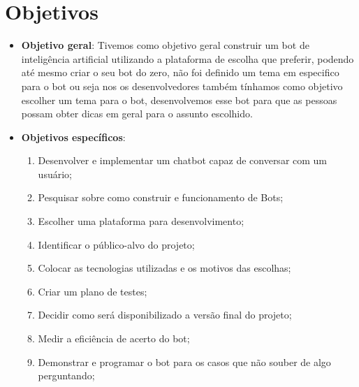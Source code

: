 \section{Objetivos}
\label{objetivos}


\begin{itemize}
		\item \textbf{Objetivo geral}: 
		    Tivemos como objetivo geral construir um bot de inteligência artificial utilizando a plataforma de escolha que preferir, podendo até mesmo criar o seu bot do zero, não foi definido um tema em especifico para o bot ou seja nos os desenvolvedores também tínhamos como objetivo escolher um tema para o bot, desenvolvemos esse bot para que as pessoas possam obter dicas em geral para o assunto escolhido.
		
		\item \textbf{Objetivos específicos}: 
    		\begin{enumerate}
    		    \item
    		        Desenvolver e implementar um chatbot capaz de conversar com um usuário;
    		    \item 
    		        Pesquisar sobre como construir e funcionamento de Bots;
    		    \item
    		        Escolher uma plataforma para desenvolvimento;
    		    \item 
    		        Identificar o público-alvo do projeto;
    		    \item 
    		        Colocar as tecnologias utilizadas e os motivos das escolhas;
    		    \item 
    		        Criar um plano de testes;
    		    \item 
    		        Decidir como será disponibilizado a versão final do projeto;
    		    \item 
    		        Medir a eficiência de acerto do bot;
    		    \item 
    		        Demonstrar e programar o bot para os casos que não souber de algo perguntando;
    		\end{enumerate}
    	
\end{itemize}

